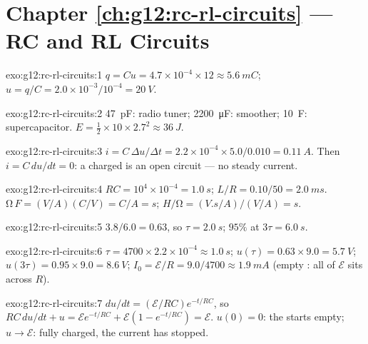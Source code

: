 \section*{Chapter \ref{ch:g12:rc-rl-circuits} --- RC and RL Circuits}

\begin{solution}{exo:g12:rc-rl-circuits:1}
$q = Cu = 4.7\times10^{-4} \times 12 \approx \qty{5.6}{mC}$;
$u = q/C = 2.0\times10^{-3}/10^{-4} = \qty{20}{V}$.
\end{solution}

\begin{solution}{exo:g12:rc-rl-circuits:2}
\qty{47}{pF}: radio tuner; \qty{2200}{\micro F}: smoother; \qty{10}{F}:
supercapacitor. $E = \tfrac12 \times 10 \times 2.7^2 \approx \qty{36}{J}$.
\end{solution}

\begin{solution}{exo:g12:rc-rl-circuits:3}
$i = C\,\Delta u/\Delta t = 2.2\times10^{-4} \times 5.0/0.010 =
\qty{0.11}{A}$. Then $i = C\,du/dt = 0$: a charged  is an open
circuit --- no steady current.
\end{solution}

\begin{solution}{exo:g12:rc-rl-circuits:4}
$RC = 10^4 \times 10^{-4} = \qty{1.0}{s}$;
$L/R = 0.10/50 = \qty{2.0}{ms}$. $\unit{\ohm}\,\unit{F} =
(\unit{V/A})(\unit{C/V}) = \unit{C/A} = \unit{s}$;
$\unit{H}/\unit{\ohm} = (\unit{V.s/A})/(\unit{V/A}) = \unit{s}$.
\end{solution}

\begin{solution}{exo:g12:rc-rl-circuits:5}
$3.8/6.0 = 0.63$, so $\tau = \qty{2.0}{s}$; $95\%$ at $3\tau =
\qty{6.0}{s}$.
\end{solution}

\begin{solution}{exo:g12:rc-rl-circuits:6}
$\tau = 4700 \times 2.2\times10^{-4} \approx \qty{1.0}{s}$;
$u(\tau) = 0.63 \times 9.0 = \qty{5.7}{V}$;
$u(3\tau) = 0.95 \times 9.0 = \qty{8.6}{V}$;
$I_0 = \mathcal{E}/R = 9.0/4700 \approx \qty{1.9}{mA}$ (empty :
all of $\mathcal{E}$ sits across $R$).
\end{solution}

\begin{solution}{exo:g12:rc-rl-circuits:7}
$du/dt = (\mathcal{E}/RC)e^{-t/RC}$, so $RC\,du/dt + u =
\mathcal{E}e^{-t/RC} + \mathcal{E}(1 - e^{-t/RC}) = \mathcal{E}$.
$u(0) = 0$: the  starts empty; $u \to \mathcal{E}$: fully
charged, the current has stopped.
\end{solution}

